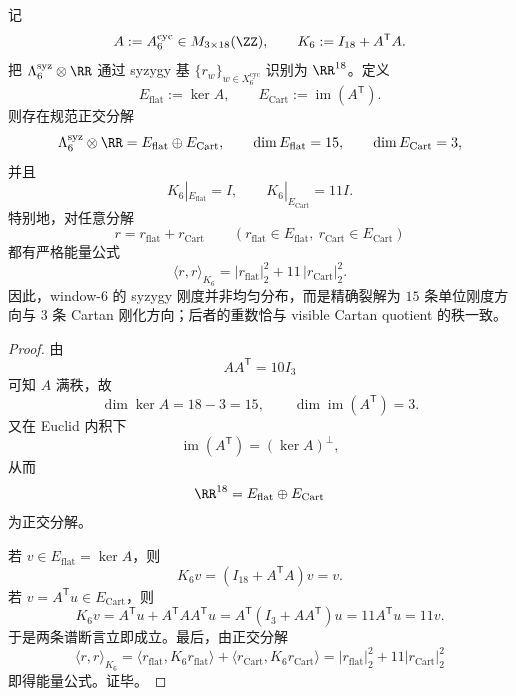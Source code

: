 \begin{theorem}\label{thm:conclusion-window6-cartan-syzygy-orthogonal-rigidity-splitting}
记
\[
A:=A_6^{\mathrm{cyc}}\in M_{3\times 18}(\ZZ),
\qquad
K_6:=I_{18}+A^{\mathsf T}A.
\]
把 \(\Lambda_6^{\mathrm{syz}}\otimes\RR\) 通过 syzygy 基 \(\{r_w\}_{w\in X_6^{\mathrm{cyc}}}\) 识别为 \(\RR^{18}\)。定义
\[
E_{\mathrm{flat}}:=\ker A,
\qquad
E_{\mathrm{Cart}}:=\operatorname{im}(A^{\mathsf T}).
\]
则存在规范正交分解
\[
\Lambda_6^{\mathrm{syz}}\otimes\RR
=
E_{\mathrm{flat}}\oplus E_{\mathrm{Cart}},
\qquad
\dim E_{\mathrm{flat}}=15,
\qquad
\dim E_{\mathrm{Cart}}=3,
\]
并且
\[
K_6|_{E_{\mathrm{flat}}}=I,
\qquad
K_6|_{E_{\mathrm{Cart}}}=11I.
\]
特别地，对任意分解
\[
r=r_{\mathrm{flat}}+r_{\mathrm{Cart}}
\qquad
(r_{\mathrm{flat}}\in E_{\mathrm{flat}},\ r_{\mathrm{Cart}}\in E_{\mathrm{Cart}})
\]
都有严格能量公式
\[
\langle r,r\rangle_{K_6}
=
|r_{\mathrm{flat}}|_2^2+11\,|r_{\mathrm{Cart}}|_2^2.
\]
因此，window-\(6\) 的 syzygy 刚度并非均匀分布，而是精确裂解为 \(15\) 条单位刚度方向与 \(3\) 条 Cartan 刚化方向；后者的重数恰与 visible Cartan quotient 的秩一致。
\end{theorem}
\begin{proof}
由
\[
AA^{\mathsf T}=10I_3
\]
可知 \(A\) 满秩，故
\[
\dim \ker A=18-3=15,
\qquad
\dim \operatorname{im}(A^{\mathsf T})=3.
\]
又在 Euclid 内积下
\[
\operatorname{im}(A^{\mathsf T})=(\ker A)^\perp,
\]
从而
\[
\RR^{18}=E_{\mathrm{flat}}\oplus E_{\mathrm{Cart}}
\]
为正交分解。

若 \(v\in E_{\mathrm{flat}}=\ker A\)，则
\[
K_6v=(I_{18}+A^{\mathsf T}A)v=v.
\]
若 \(v=A^{\mathsf T}u\in E_{\mathrm{Cart}}\)，则
\[
K_6v
=
A^{\mathsf T}u+A^{\mathsf T}AA^{\mathsf T}u
=
A^{\mathsf T}(I_3+AA^{\mathsf T})u
=
11A^{\mathsf T}u
=
11v.
\]
于是两条谱断言立即成立。最后，由正交分解
\[
\langle r,r\rangle_{K_6}
=
\langle r_{\mathrm{flat}},K_6r_{\mathrm{flat}}\rangle
+\langle r_{\mathrm{Cart}},K_6r_{\mathrm{Cart}}\rangle
=
|r_{\mathrm{flat}}|_2^2+11|r_{\mathrm{Cart}}|_2^2
\]
即得能量公式。证毕。
\end{proof}

